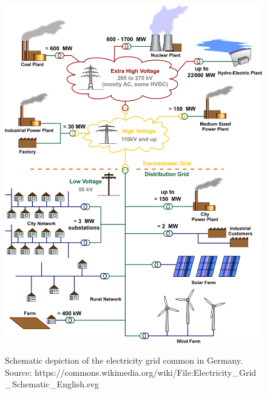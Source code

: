 \begin{figure}[h]
	\begin{centering}
		{\includegraphics[scale=0.27]{figures/background/grid_schematicc.pdf}}
		\caption[Schematic depiction of the electricity grid]{Schematic depiction of the electricity grid common in Germany. Source: https://commons.wikimedia.org/wiki/File:Electricity$\protect\_$Grid$\protect\_$Schematic$\protect\_$English.svg}
		\label{fig:schematic_grid}
	\end{centering}
\end{figure}
